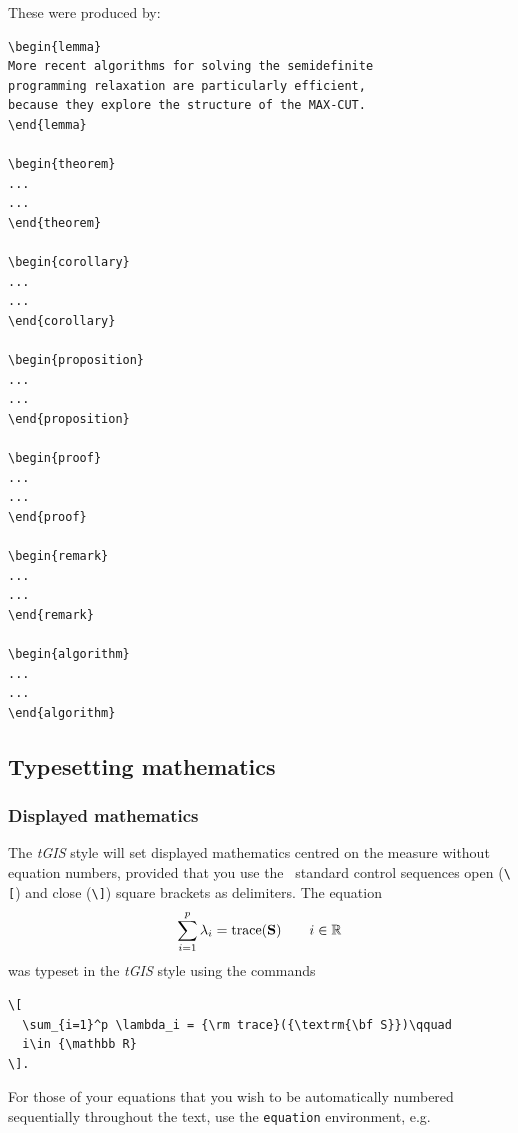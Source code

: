 \documentclass[]{tGIS2e}
\begin{document}
\noindent These were produced by:
\begin{verbatim}
\begin{lemma}
More recent algorithms for solving the semidefinite
programming relaxation are particularly efficient,
because they explore the structure of the MAX-CUT.
\end{lemma}

\begin{theorem}
...
...
\end{theorem}

\begin{corollary}
...
...
\end{corollary}

\begin{proposition}
...
...
\end{proposition}

\begin{proof}
...
...
\end{proof}

\begin{remark}
...
...
\end{remark}

\begin{algorithm}
...
...
\end{algorithm}

\end{verbatim}


\subsection{Typesetting mathematics}\label{TMth}

\subsubsection{Displayed mathematics}

The {\it tGIS} style will set displayed mathematics centred on the measure without equation numbers, provided
that you use the \LaTeXe\ standard control sequences open (\verb"\[") and close (\verb"\]") square brackets as
delimiters. The equation
\[
  \sum_{i=1}^p \lambda_i = {\rm trace}({\textrm{\bf S}})\qquad
  i\in {\mathbb R}
\]
\normalfont was typeset in the {\it tGIS} style using the commands
%
\begin{verbatim}
\[
  \sum_{i=1}^p \lambda_i = {\rm trace}({\textrm{\bf S}})\qquad
  i\in {\mathbb R}
\].
\end{verbatim}

For those of your equations that you wish to be automatically
numbered sequentially throughout the text, use the {\tt{equation}}
environment, e.g.
\end{document}

